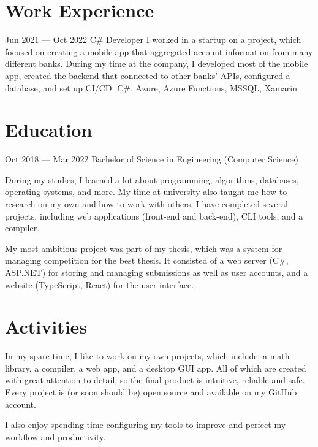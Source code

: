 \begin{tcolorbox}
\begin{minipage}[t]{0.7\textwidth}
\begin{tcolorbox}[grow to right by=0.75cm,height=0.8\textheight,colframe=white,colback=white]
            \section*{Work Experience}
            {Jun 2021 --- Oct 2022}
            {C\# Developer}{
                I worked in a startup on a project, which focused on creating a mobile app that aggregated account information from many different banks.
                During my time at the company, I developed most of the mobile app,
                created the backend that connected to other banks’ APIs,
                configured a database, and set up CI/CD.\@
            }
            {C\#, Azure, Azure Functions, MSSQL, Xamarin}
            
            \section*{Education}
            {Oct 2018 --- Mar 2022}
            {Bachelor of Science in Engineering (Computer Science)}
            {
                During my studies, I learned a lot about programming, algorithms, databases, operating systems, and more.
                My time at university also taught me how to research on my own and how to work with others.
                I have completed several projects, including web applications (front-end and back-end), CLI tools, and a compiler.
                
                My most ambitious project was part of my thesis, which was a system for managing competition for the best thesis.
                It consisted of a web server (C\#, ASP.NET) for storing and managing submissions as well as user accounts,
                and a website (TypeScript, React) for the user interface.
            } 
            \section*{Activities}
            
            In my spare time, I like to work on my own projects, which include: a math library, a compiler, a web app, and a desktop GUI app.
            All of which are created with great attention to detail, so the final product is intuitive, reliable and safe.
            Every project is (or soon should be) open source and available on my GitHub account.
            
            I also enjoy spending time configuring my tools to improve and perfect my workflow and productivity.
        \end{tcolorbox}
    \end{minipage}
\end{tcolorbox}


